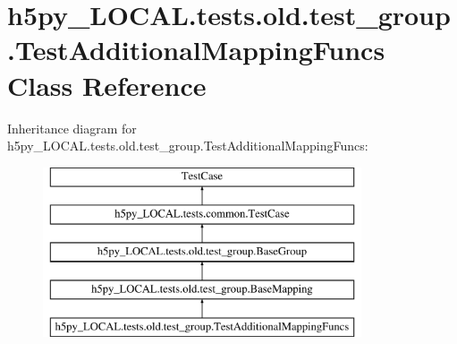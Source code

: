 \hypertarget{classh5py__LOCAL_1_1tests_1_1old_1_1test__group_1_1TestAdditionalMappingFuncs}{}\section{h5py\+\_\+\+L\+O\+C\+A\+L.\+tests.\+old.\+test\+\_\+group.\+Test\+Additional\+Mapping\+Funcs Class Reference}
\label{classh5py__LOCAL_1_1tests_1_1old_1_1test__group_1_1TestAdditionalMappingFuncs}
Inheritance diagram for h5py\+\_\+\+L\+O\+C\+A\+L.\+tests.\+old.\+test\+\_\+group.\+Test\+Additional\+Mapping\+Funcs\+:\begin{figure}[H]
\begin{center}
\leavevmode
\includegraphics[height=5.000000cm]{classh5py__LOCAL_1_1tests_1_1old_1_1test__group_1_1TestAdditionalMappingFuncs}
\end{center}
\end{figure}

